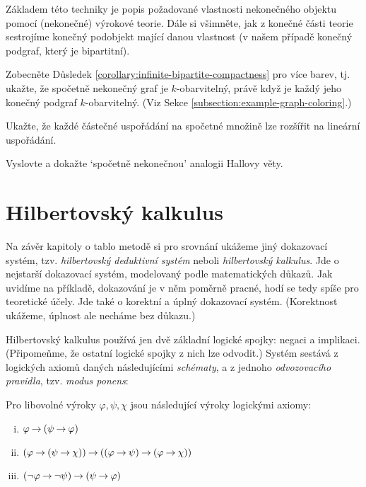 Základem této techniky je popis požadované vlastnosti nekonečného objektu pomocí (nekonečné) výrokové teorie. Dále si všimněte, jak z konečné části teorie sestrojíme konečný podobjekt mající danou vlastnost (v našem případě konečný podgraf, který je bipartitní).

\begin{exercise}
    Zobecněte Důsledek \ref{corollary:infinite-bipartite-compactness} pro více barev, tj. ukažte, že spočetně nekonečný graf je $k$-obarvitelný, právě když je každý jeho konečný podgraf $k$-obarvitelný. (Viz Sekce \ref{subsection:example-graph-coloring}.)
\end{exercise}

\begin{exercise}
    Ukažte, že každé částečné uspořádání na spočetné množině lze rozšířit na lineární uspořádání.
\end{exercise}

\begin{exercise}
    Vyslovte a dokažte `spočetně nekonečnou' analogii Hallovy věty.
\end{exercise}

\section{Hilbertovský kalkulus}\label{section:hilbert-calculus-propositional}

Na závěr kapitoly o tablo metodě si pro srovnání ukážeme jiný dokazovací systém, tzv. \emph{hilbertovský deduktivní systém} neboli \emph{hilbertovský kalkulus}. Jde o nejstarší dokazovací systém, modelovaný podle matematických důkazů. Jak uvidíme na příkladě, dokazování je v něm poměrně pracné, hodí se tedy spíše pro teoretické účely. Jde také o korektní a úplný dokazovací systém. (Korektnost ukážeme, úplnost ale necháme bez důkazu.)

Hilbertovský kalkulus používá jen dvě základní logické spojky: negaci a implikaci. (Připomeňme, že ostatní logické spojky z nich lze odvodit.) Systém sestává z logických axiomů daných následujícími \emph{schématy}, a z jednoho \emph{odvozovacího pravidla}, tzv. \emph{modus ponens}: 

\begin{definition}
Pro libovolné výroky $\varphi,\psi,\chi$ jsou následující výroky logickými axiomy:
\begin{enumerate}[(i)]
    \item $\varphi \mathbin{\rightarrow} (\psi \mathbin{\rightarrow} \varphi)$
    \item $(\varphi\mathbin{\rightarrow} (\psi \mathbin{\rightarrow} \chi))\mathbin{\rightarrow} ((\varphi \mathbin{\rightarrow} \psi)\mathbin{\rightarrow}(\varphi \mathbin{\rightarrow} \chi))$
    \item $(\neg \varphi \mathbin{\rightarrow} \neg \psi)\mathbin{\rightarrow}(\psi \mathbin{\rightarrow} \varphi)$
\end{enumerate}        
\end{definition}

